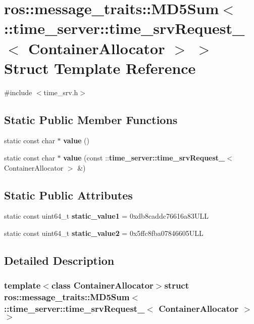 \section{ros\-:\-:message\-\_\-traits\-:\-:\-M\-D5\-Sum$<$ \-:\-:time\-\_\-server\-:\-:time\-\_\-srv\-Request\-\_\-$<$ \-Container\-Allocator $>$ $>$ \-Struct \-Template \-Reference}
\label{structros_1_1message__traits_1_1MD5Sum_3_01_1_1time__server_1_1time__srvRequest___3_01ContainerAllocator_01_4_01_4}


{\ttfamily \#include $<$time\-\_\-srv.\-h$>$}

\subsection*{\-Static \-Public \-Member \-Functions}
\begin{DoxyCompactItemize}
\item 
static const char $\ast$ {\bf value} ()
\item 
static const char $\ast$ {\bf value} (const \-::{\bf time\-\_\-server\-::time\-\_\-srv\-Request\-\_\-}$<$ \-Container\-Allocator $>$ \&)
\end{DoxyCompactItemize}
\subsection*{\-Static \-Public \-Attributes}
\begin{DoxyCompactItemize}
\item 
static const uint64\-\_\-t {\bf static\-\_\-value1} = 0xdb8caddc76616a83\-U\-L\-L
\item 
static const uint64\-\_\-t {\bf static\-\_\-value2} = 0x5ffc8fba07846605\-U\-L\-L
\end{DoxyCompactItemize}


\subsection{\-Detailed \-Description}
\subsubsection*{template$<$class Container\-Allocator$>$struct ros\-::message\-\_\-traits\-::\-M\-D5\-Sum$<$ \-::time\-\_\-server\-::time\-\_\-srv\-Request\-\_\-$<$ Container\-Allocator $>$ $>$}



